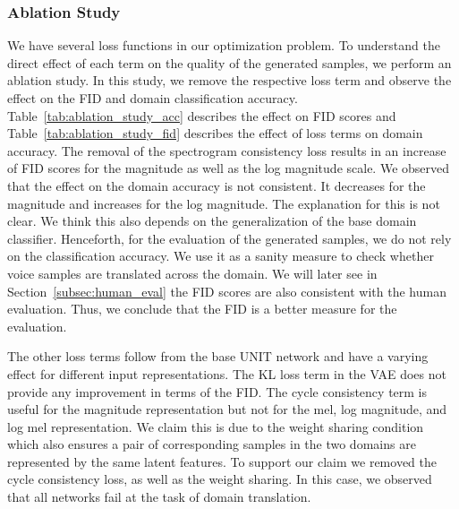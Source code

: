 \subsubsection{Ablation Study}
\label{subsec:ablation}
We have several loss functions in our optimization problem. To understand the direct effect of each term on the quality of the generated samples, we perform an ablation study. In this study, we remove the respective loss term and observe the effect on the FID and domain classification accuracy. Table~\ref{tab:ablation_study_acc} describes the effect on FID scores and Table~\ref{tab:ablation_study_fid} describes the effect of loss terms on domain accuracy. The removal of the spectrogram consistency loss results in an increase of FID scores for the magnitude as well as the log magnitude scale. We observed that the effect on the domain accuracy is not consistent. It decreases for the magnitude and increases for the log magnitude. The explanation for this is not clear. We think this also depends on the generalization of the base domain classifier. Henceforth, for the evaluation of the generated samples, we do not rely on the classification accuracy. We use it as a sanity measure to check whether voice samples are translated across the domain. We will later see in Section~\ref{subsec:human_eval} the FID scores are also consistent with the human evaluation. Thus, we conclude that the FID is a better measure for the evaluation. 

The other loss terms follow from the base UNIT network and have a varying effect for different input representations. The KL loss term in the VAE does not provide any improvement in terms of the FID. The cycle consistency term is useful for the magnitude representation but not for the mel, log magnitude, and log mel representation. We claim this is due to the weight sharing condition which also ensures a pair of corresponding samples in the two domains are represented by the same latent features. To support our claim we removed the cycle consistency loss, as well as the weight sharing. In this case, we observed that all networks fail at the task of domain translation. 

